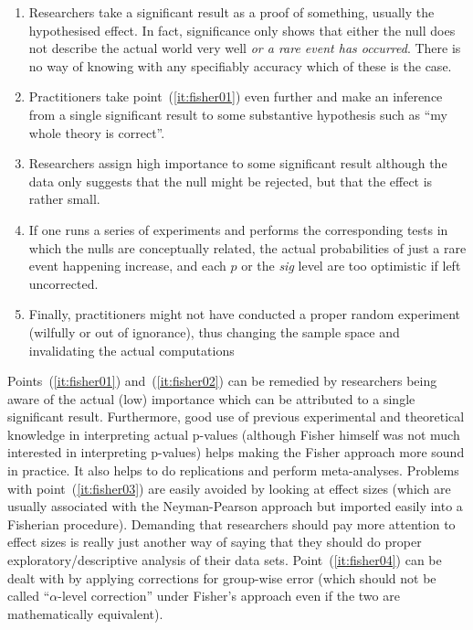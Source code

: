 \vspace{\baselineskip}
\begin{enumerate}
  \item \label{it:fisher01} Researchers take a significant result as a proof of something, usually the hypothesised effect.
    In fact, significance only shows that either the null does not describe the actual world very well \textit{or a rare event has occurred}.
    There is no way of knowing with any specifiably accuracy which of these is the case.
  \item \label{it:fisher02} Practitioners take point~(\ref{it:fisher01}) even further and make an inference from a single significant result to some substantive hypothesis such as ``my whole theory is correct''.
  \item \label{it:fisher03} Researchers assign high importance to some significant result although the data only suggests that the null might be rejected, but that the effect is rather small.
  \item \label{it:fisher04} If one runs a series of experiments and performs the corresponding tests in which the nulls are conceptually related, the actual probabilities of just a rare event happening increase, and each $p$ or the \textit{sig} level are too optimistic if left uncorrected.
  \item \label{it:fisher05} Finally, practitioners might not have conducted a proper random experiment (wilfully or out of ignorance), thus changing the sample space and invalidating the actual computations
\end{enumerate}
\vspace{\baselineskip}

Points~(\ref{it:fisher01}) and~(\ref{it:fisher02}) can be remedied by researchers being aware of the actual (low) importance which can be attributed to a single significant result.
Furthermore, good use of previous experimental and theoretical knowledge in interpreting actual p-values (although Fisher himself was not much interested in interpreting p-values) helps making the Fisher approach more sound in practice.
It also helps to do replications and perform meta-analyses.
Problems with point~(\ref{it:fisher03}) are easily avoided by looking at effect sizes (which are usually associated with the Neyman-Pearson approach but imported easily into a Fisherian procedure).
Demanding that researchers should pay more attention to effect sizes is really just another way of saying that they should do proper exploratory\slash descriptive analysis of their data sets.
Point~(\ref{it:fisher04}) can be dealt with by applying corrections for group-wise error (which should not be called ``$\alpha$-level correction'' under Fisher's approach even if the two are mathematically equivalent).

